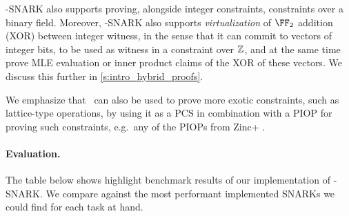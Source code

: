 \ftwoz-SNARK also supports proving, alongside integer constraints, constraints over a binary field. Moreover, \ftwoz-SNARK also supports \emph{virtualization} of $\FF_2$ addition (XOR) between integer witness, in the sense that it can commit to  vectors of integer bits, to be used as witness in a constraint over $\mathbb{Z}$, and at the same time prove MLE evaluation or inner product claims of the XOR of these vectors.  We discuss this further in \cref{s:intro_hybrid_proofs}.  

We emphasize that \ftwoz\ can also be used  to prove more exotic constraints, such as lattice-type operations, by using it as a PCS in combination with a PIOP for proving such constraints, e.g.\ any of the PIOPs from Zinc+ \cite{zincplus}. 



\paragraph{Evaluation.} The table below shows highlight benchmark results of our implementation of \ftwoz-SNARK. We compare against the most performant implemented SNARKs we could find for each task at hand. %



